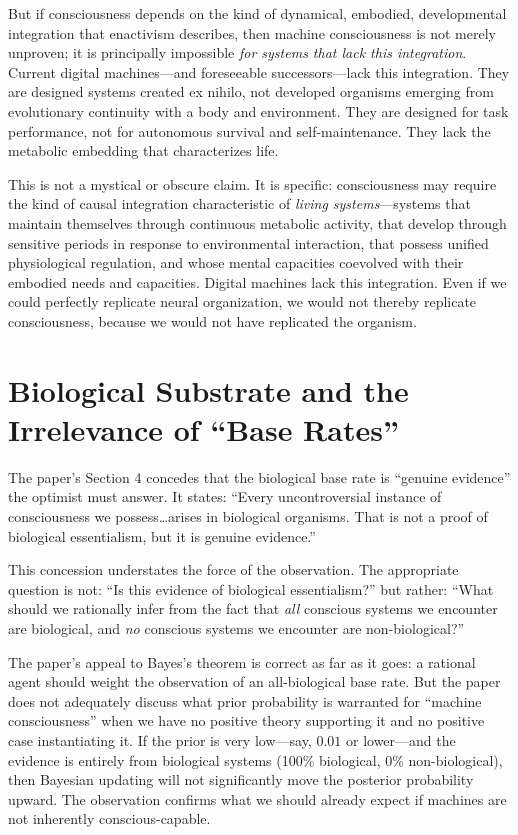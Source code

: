 \documentclass[11pt]{article}
\begin{document}
But if consciousness depends on the kind of dynamical, embodied, developmental integration that enactivism describes, then machine consciousness is not merely unproven; it is principally impossible \textit{for systems that lack this integration}. Current digital machines---and foreseeable successors---lack this integration. They are designed systems created ex nihilo, not developed organisms emerging from evolutionary continuity with a body and environment. They are designed for task performance, not for autonomous survival and self-maintenance. They lack the metabolic embedding that characterizes life.

This is not a mystical or obscure claim. It is specific: consciousness may require the kind of causal integration characteristic of \textit{living systems}---systems that maintain themselves through continuous metabolic activity, that develop through sensitive periods in response to environmental interaction, that possess unified physiological regulation, and whose mental capacities coevolved with their embodied needs and capacities. Digital machines lack this integration. Even if we could perfectly replicate neural organization, we would not thereby replicate consciousness, because we would not have replicated the organism.

\section{Biological Substrate and the Irrelevance of ``Base Rates''}

The paper's Section 4 concedes that the biological base rate is ``genuine evidence'' the optimist must answer. It states: ``Every uncontroversial instance of consciousness we possess\ldots arises in biological organisms. That is not a proof of biological essentialism, but it is genuine evidence.''

This concession understates the force of the observation. The appropriate question is not: ``Is this evidence of biological essentialism?'' but rather: ``What should we rationally infer from the fact that \textit{all} conscious systems we encounter are biological, and \textit{no} conscious systems we encounter are non-biological?''

The paper's appeal to Bayes's theorem is correct as far as it goes: a rational agent should weight the observation of an all-biological base rate. But the paper does not adequately discuss what prior probability is warranted for ``machine consciousness'' when we have no positive theory supporting it and no positive case instantiating it. If the prior is very low---say, $0.01$ or lower---and the evidence is entirely from biological systems (100\% biological, 0\% non-biological), then Bayesian updating will not significantly move the posterior probability upward. The observation confirms what we should already expect if machines are not inherently conscious-capable.
\end{document}
